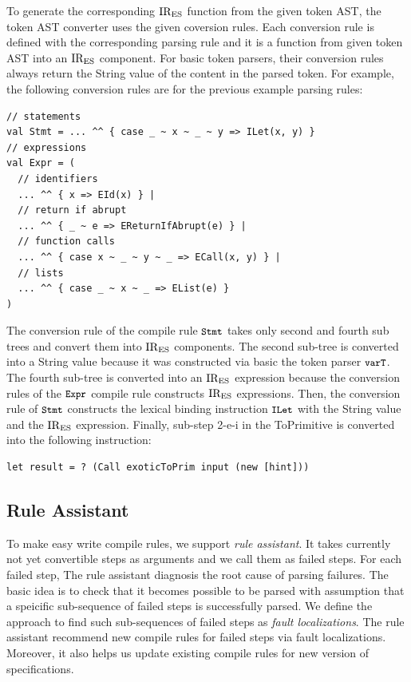 To generate the corresponding \( \text{IR}_\text{ES} \) function from the given token AST,
the token AST converter uses the given coversion rules. Each conversion rule is
defined with the corresponding parsing rule and it is a function from given token AST
into an \( \text{IR}_\text{ES} \) component. For basic token parsers, their conversion rules
always return the String value of the content in the parsed token.
For example, the following conversion rules are for the previous example
parsing rules:
\begin{lstlisting}[style=myScalastyle]
// statements
val Stmt = ... ^^ { case _ ~ x ~ _ ~ y => ILet(x, y) }
// expressions
val Expr = (
  // identifiers
  ... ^^ { x => EId(x) } |
  // return if abrupt
  ... ^^ { _ ~ e => EReturnIfAbrupt(e) } |
  // function calls
  ... ^^ { case x ~ _ ~ y ~ _ => ECall(x, y) } |
  // lists
  ... ^^ { case _ ~ x ~ _ => EList(e) }
)
\end{lstlisting}
The conversion rule of the compile rule \( \texttt{\small Stmt} \) takes
only second and fourth sub trees and convert them into \( \text{IR}_\text{ES} \) components.
The second sub-tree is converted into a String value because it was
constructed via basic the token parser \( \texttt{\small varT} \).
The fourth sub-tree is converted into an \( \text{IR}_\text{ES} \) expression
because the conversion rules of the \( \texttt{\small Expr} \) compile rule
constructs \( \text{IR}_\text{ES} \) expressions.
Then, the conversion rule of \( \texttt{\small Stmt} \) constructs the
lexical binding instruction \( \texttt{\small ILet} \) with the String value
and the \( \text{IR}_\text{ES} \) expression. Finally, sub-step 2-e-i in the ToPrimitive
is converted into the following instruction:
\begin{lstlisting}[style=ires]
let result = ? (Call exoticToPrim input (new [hint]))
\end{lstlisting}


\subsection{Rule Assistant}

To make easy write compile rules, we support \textit{rule assistant}.
It takes currently not yet convertible steps as arguments
and we call them as failed steps. For each failed step,
The rule assistant diagnosis the root cause of parsing failures.
The basic idea is to check that it becomes possible to be parsed
with assumption that a speicific sub-sequence of failed steps is
successfully parsed. We define the approach to find such sub-sequences of
failed steps as \textit{fault localizations}. The rule assistant recommend
new compile rules for failed steps via fault localizations.
Moreover, it also helps us update existing compile rules for new version
of specifications.

